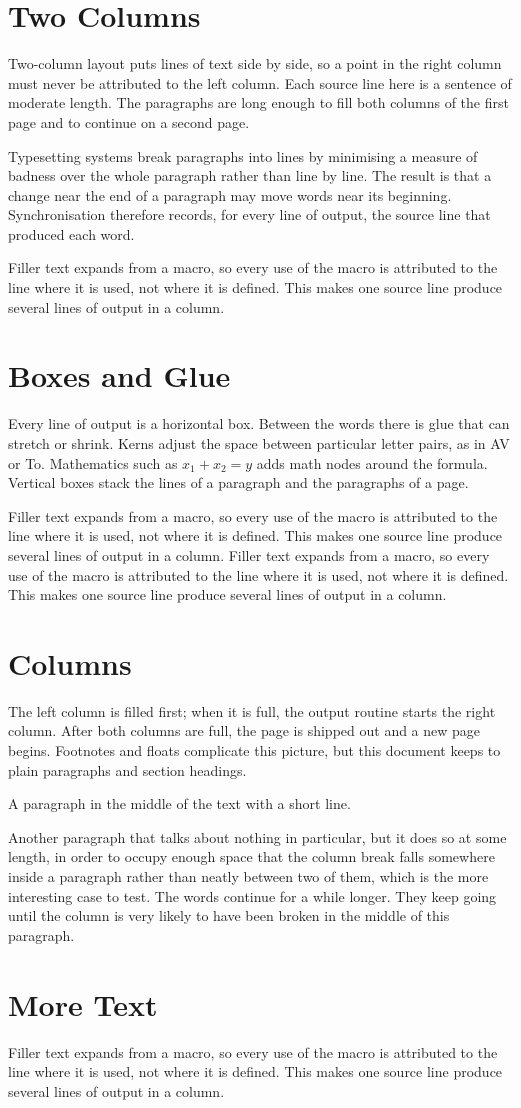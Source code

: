 \documentclass[twocolumn]{article}
\newcommand{\filler}{Filler text expands from a macro, so every use of the macro is attributed to the line where it is used, not where it is defined. This makes one source line produce several lines of output in a column.}
\begin{document}
\section{Two Columns}
Two-column layout puts lines of text side by side,
so a point in the right column must never be attributed to the left column.
Each source line here is a sentence of moderate length.
The paragraphs are long enough to fill both columns of the first page
and to continue on a second page.

Typesetting systems break paragraphs into lines by minimising a measure of badness
over the whole paragraph rather than line by line.
The result is that a change near the end of a paragraph may move words near its beginning.
Synchronisation therefore records, for every line of output, the source line that produced each word.

\filler

\section{Boxes and Glue}
Every line of output is a horizontal box.
Between the words there is glue that can stretch or shrink.
Kerns adjust the space between particular letter pairs, as in AV or To.
Mathematics such as $x_1 + x_2 = y$ adds math nodes around the formula.
Vertical boxes stack the lines of a paragraph and the paragraphs of a page.

\filler
\filler

\section{Columns}
The left column is filled first; when it is full, the output routine starts the right column.
After both columns are full, the page is shipped out and a new page begins.
Footnotes and floats complicate this picture,
but this document keeps to plain paragraphs and section headings.

A paragraph in the middle of the text with a short line.

Another paragraph that talks about nothing in particular, but it does so at some length,
in order to occupy enough space that the column break falls somewhere inside a paragraph
rather than neatly between two of them, which is the more interesting case to test.
The words continue for a while longer.
They keep going until the column is very likely to have been broken in the middle of this paragraph.

\section{More Text}
\filler
\end{document}
